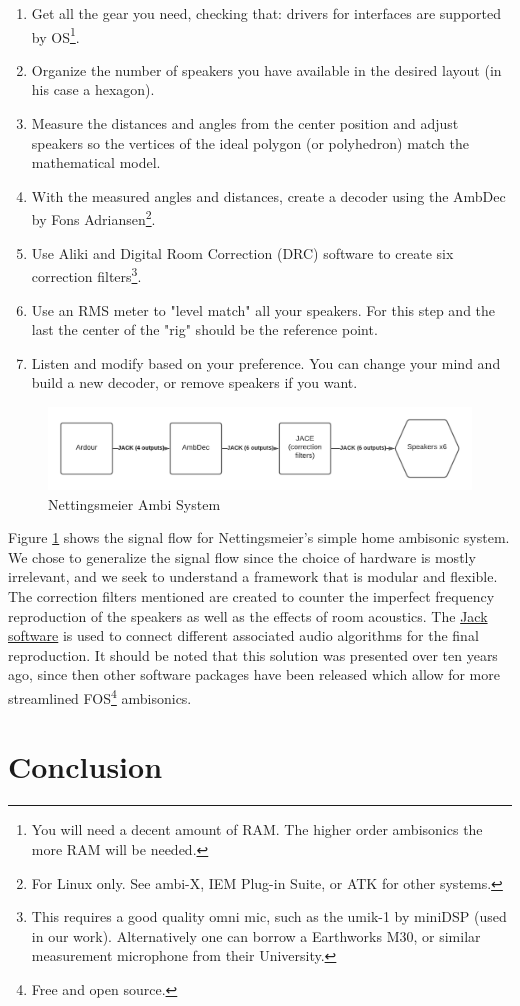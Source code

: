 \begin{enumerate}
    \item Get all the gear you need, checking that: drivers for interfaces are supported by OS\footnote{You will need a decent amount of RAM. The higher order ambisonics the more RAM will be needed.}.
    \item Organize the number of speakers you have available in the desired layout (in his case a hexagon). 
    \item Measure the distances and angles from the center position and adjust speakers so the vertices of the ideal polygon (or polyhedron) match the mathematical model.  
    \item With the measured angles and distances, create a decoder using the AmbDec by Fons Adriansen\footnote{For Linux only. See ambi-X, IEM Plug-in Suite, or ATK for other systems.}.
    \item Use Aliki and Digital Room Correction (DRC) software to create six correction filters\footnote{This requires a good quality omni mic, such as the umik-1 by miniDSP (used in our work). Alternatively one can borrow a Earthworks M30, or similar measurement microphone from their University.}.
    \item Use an RMS meter to "level match" all your speakers. For this step and the last the center of the "rig" should be the reference point. 
    \item Listen and modify based on your preference. You can change your mind and build a new decoder, or remove speakers if you want. 
\end{enumerate}

\begin{figure}[ht]%
\centering
\includegraphics[width=1.0\textwidth]{img/nettingsmeier-extra-frontal.png} 
\caption{Nettingsmeier Ambi System}
\label{fig:extra-frontal}
\end{figure}

Figure \ref{fig:extra-frontal} shows the signal flow for Nettingsmeier's simple home ambisonic system. We chose to generalize the signal flow since the choice of hardware is mostly irrelevant, and we seek to understand a framework that is modular and flexible. The correction filters mentioned are created to counter the imperfect frequency reproduction of the speakers as well as the effects of room acoustics. The \href{https://jackaudio.org/}{Jack software} is used to connect different associated audio algorithms for the final reproduction. It should be noted that this solution was presented over ten years ago, since then other software packages have been released which allow for more streamlined FOS\footnote{Free and open source.} ambisonics. 


\section{Conclusion}